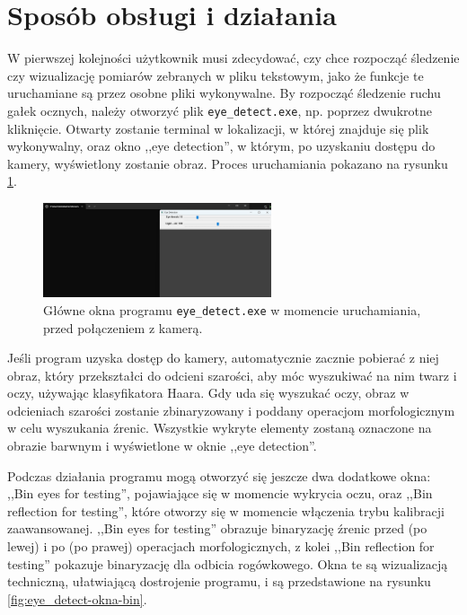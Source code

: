 \documentclass[a4paper,twoside,12pt]{book}
\begin{document}
\section{Sposób obsługi i działania}
\label{sec:Sposob-obslugi}

W pierwszej kolejności użytkownik musi zdecydować, czy chce rozpocząć śledzenie czy wizualizację pomiarów zebranych w pliku tekstowym, jako że funkcje te uruchamiane są przez osobne pliki wykonywalne. By rozpocząć śledzenie ruchu gałek ocznych, należy otworzyć plik \texttt{eye\_\-detect.exe}, np. poprzez dwukrotne kliknięcie. Otwarty zostanie terminal w lokalizacji, w której znajduje się plik wykonywalny, oraz okno ,,eye detection'', w którym, po uzyskaniu dostępu do kamery, wyświetlony zostanie obraz. Proces uruchamiania pokazano na rysunku \ref{fig:eye_detect-uruchamianie}.

\begin{figure}[htbp]
	\centering
	\includegraphics[width=0.6\textwidth]{pic/obsługa/okna przy otwarciu.png}
	\caption{Główne okna programu \texttt{eye\_\-detect.exe} w momencie uruchamiania, przed połączeniem z kamerą.}
	\label{fig:eye_detect-uruchamianie}
\end{figure}

Jeśli program uzyska dostęp do kamery, automatycznie zacznie pobierać z niej obraz, który przekształci do odcieni szarości, aby móc wyszukiwać na nim twarz i oczy, używając klasyfikatora Haara. Gdy uda się wyszukać oczy, obraz w odcieniach szarości zostanie zbinaryzowany i poddany operacjom morfologicznym w celu wyszukania źrenic. Wszystkie wykryte elementy zostaną oznaczone na obrazie barwnym i wyświetlone w oknie ,,eye detection''.

Podczas działania programu mogą otworzyć się jeszcze dwa dodatkowe okna: ,,Bin eyes for testing'', pojawiające się w momencie wykrycia oczu, oraz ,,Bin reflection for testing'', które otworzy się w momencie włączenia trybu kalibracji zaawansowanej. ,,Bin eyes for testing'' obrazuje binaryzację źrenic przed (po lewej) i po (po prawej) operacjach morfologicznych, z kolei ,,Bin reflection for testing'' pokazuje binaryzację dla odbicia rogówkowego. Okna te są wizualizacją techniczną, ułatwiającą dostrojenie programu, i są przedstawione na rysunku \ref{fig:eye_detect-okna-bin}.
\end{document}
